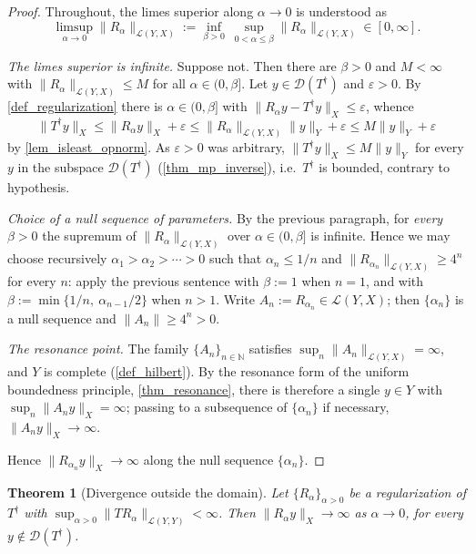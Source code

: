 \documentclass[a4paper]{report}
\theoremstyle{plain}
\newtheorem{theorem}{Theorem}[chapter]
\theoremstyle{definition}
\theoremstyle{remark}
\newcommand{\Ll}{\mathcal{L}}
\newcommand{\Dom}{\mathcal{D}}
\newcommand{\dg}{^{\dagger}}
\begin{document}
\begin{proof}
  Throughout, the limes superior along $\alpha \to 0$ is understood as
  \[
    \limsup_{\alpha \to 0}\|R_{\alpha}\|_{\Ll(Y,X)}
      := \inf_{\beta > 0}\ \sup_{0 < \alpha \le \beta}\|R_{\alpha}\|_{\Ll(Y,X)}
      \in [0,\infty] .
  \]

  \emph{The limes superior is infinite.}  Suppose not.  Then there are $\beta > 0$ and
  $M < \infty$ with $\|R_{\alpha}\|_{\Ll(Y,X)} \le M$ for all $\alpha \in (0,\beta]$.  Let
  $y \in \Dom(T\dg)$ and $\varepsilon > 0$.  By \cref{def_regularization} there is
  $\alpha \in (0,\beta]$ with $\|R_{\alpha}y - T\dg y\|_X \le \varepsilon$, whence
  \[
    \|T\dg y\|_X \le \|R_{\alpha}y\|_X + \varepsilon
      \le \|R_{\alpha}\|_{\Ll(Y,X)}\|y\|_Y + \varepsilon \le M\|y\|_Y + \varepsilon
  \]
  by \cref{lem_isleast_opnorm}.  As $\varepsilon > 0$ was arbitrary,
  $\|T\dg y\|_X \le M\|y\|_Y$ for every $y$ in the subspace $\Dom(T\dg)$
  (\cref{thm_mp_inverse}), i.e.\ $T\dg$ is bounded, contrary to hypothesis.

  \emph{Choice of a null sequence of parameters.}  By the previous paragraph, for
  \emph{every} $\beta > 0$ the supremum of $\|R_{\alpha}\|_{\Ll(Y,X)}$ over
  $\alpha \in (0,\beta]$ is infinite.
  Hence we may choose recursively $\alpha_1 > \alpha_2 > \cdots > 0$ such that
  $\alpha_n \le 1/n$ and $\|R_{\alpha_n}\|_{\Ll(Y,X)} \ge 4^{n}$ for every $n$: apply
  the previous sentence with $\beta := 1$ when $n = 1$, and with
  $\beta := \min\{1/n,\ \alpha_{n-1}/2\}$ when $n > 1$.  Write
  $A_n := R_{\alpha_n} \in \Ll(Y,X)$; then $\{\alpha_n\}$ is a null sequence and
  $\|A_n\| \ge 4^{n} > 0$.

  \emph{The resonance point.}  The family $\{A_n\}_{n \in \mathbb{N}}$ satisfies
  $\sup_n\|A_n\|_{\Ll(Y,X)} = \infty$, and $Y$ is complete (\cref{def_hilbert}).  By the
  resonance form of the uniform boundedness principle, \cref{thm_resonance}, there is
  therefore a single $y \in Y$ with $\sup_n\|A_ny\|_X = \infty$; passing to a subsequence
  of $\{\alpha_n\}$ if necessary, $\|A_ny\|_X \to \infty$.

  Hence $\|R_{\alpha_n}y\|_X \to \infty$ along the null sequence $\{\alpha_n\}$.
\end{proof}


\begin{theorem}[Divergence outside the domain]
  \label{thm_reg_diverges_outside_domain}
  Let $\{R_{\alpha}\}_{\alpha>0}$ be a regularization of $T\dg$ with
  $\sup_{\alpha>0}\|TR_{\alpha}\|_{\Ll(Y,Y)} < \infty$.  Then
  $\|R_{\alpha}y\|_X \to \infty$ as $\alpha \to 0$, for every $y \notin \Dom(T\dg)$.
\end{theorem}
\end{document}

